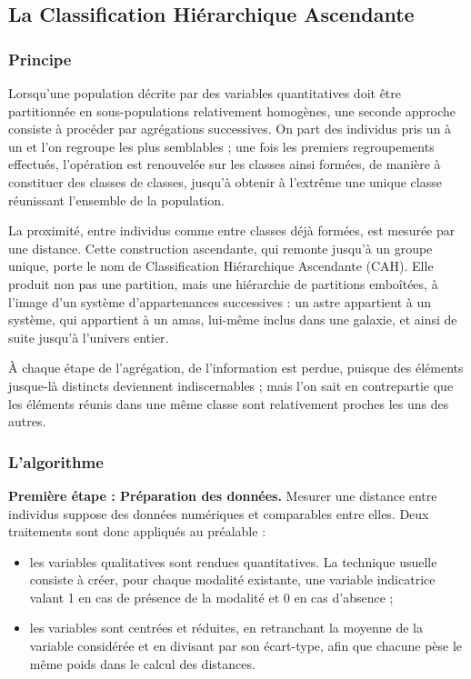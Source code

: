 \subsection*{La Classification Hiérarchique Ascendante}

\subsubsection*{Principe}

Lorsqu'une population décrite par des variables quantitatives doit être partitionnée en sous-populations relativement homogènes, une seconde approche consiste à procéder par agrégations successives. On part des individus pris un à un et l'on regroupe les plus semblables ; une fois les premiers regroupements effectués, l'opération est renouvelée sur les classes ainsi formées, de manière à constituer des classes de classes, jusqu'à obtenir à l'extrême une unique classe réunissant l'ensemble de la population.

La proximité, entre individus comme entre classes déjà formées, est mesurée par une distance. Cette construction ascendante, qui remonte jusqu'à un groupe unique, porte le nom de Classification Hiérarchique Ascendante (CAH). Elle produit non pas une partition, mais une hiérarchie de partitions emboîtées, à l'image d'un système d'appartenances successives : un astre appartient à un système, qui appartient à un amas, lui-même inclus dans une galaxie, et ainsi de suite jusqu'à l'univers entier.

À chaque étape de l'agrégation, de l'information est perdue, puisque des éléments jusque-là distincts deviennent indiscernables ; mais l'on sait en contrepartie que les éléments réunis dans une même classe sont relativement proches les uns des autres.

\subsubsection*{L'algorithme}

\textbf{Première étape : Préparation des données.} Mesurer une distance entre individus suppose des données numériques et comparables entre elles. Deux traitements sont donc appliqués au préalable :

\begin{itemize}[label=$\bullet$]
    \item les variables qualitatives sont rendues quantitatives. La technique usuelle consiste à créer, pour chaque modalité existante, une variable indicatrice valant 1 en cas de présence de la modalité et 0 en cas d'absence ;
    \item les variables sont centrées et réduites, en retranchant la moyenne de la variable considérée et en divisant par son écart-type, afin que chacune pèse le même poids dans le calcul des distances.
\end{itemize}

